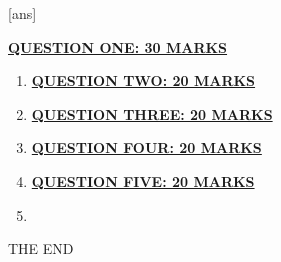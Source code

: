 		
		\newpage
			\begin{center}
			\textbf{\underline{QUESTION ONE: 30 MARKS}}
		\end{center}
\begin{enumerate}
\item
\begin{center} \underline{\textbf{QUESTION TWO: 20 MARKS}} \end{center}
\item
\begin{center} \underline{\textbf{QUESTION THREE: 20 MARKS}} \end{center}

\item

\begin{center} \underline{\textbf{QUESTION FOUR: 20 MARKS}} \end{center}
\item
\begin{center} \underline{\textbf{QUESTION FIVE: 20 MARKS}} \end{center}

\item
\end{enumerate}
\begin{center}
THE END
\par\end{center}
